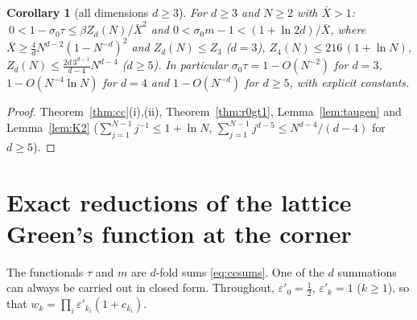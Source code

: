 \documentclass[11pt,a4paper]{article}
\newcommand{\Xb}{\bar X}
\theoremstyle{plain}
\newtheorem{corollary}[theorem]{Corollary}
\theoremstyle{definition}
\numberwithin{equation}{section}
\begin{document}
\begin{corollary}[all dimensions $d\ge3$]\label{cor:alld}
For $d\ge3$ and $N\ge2$ with $\Xb>1$: $\ 0<1-\sigma_0\tau\le\beta Z_d(N)/\Xb^2$ and $0<\sigma_0m-1<(1+\ln 2d)/\Xb$, where $\Xb\ge\frac4dN^{d-2}(1-N^{-d})^2$ and $Z_d(N)\le Z_3$ ($d=3$), $Z_4(N)\le216\,(1+\ln N)$, $Z_d(N)\le\frac{2d\,3^{d-1}}{d-4}N^{d-4}$ ($d\ge5$). In particular $\sigma_0\tau=1-O(N^{-2})$ for $d=3$, $1-O(N^{-4}\ln N)$ for $d=4$ and $1-O(N^{-d})$ for $d\ge5$, with explicit constants.
\end{corollary}
\begin{proof}
Theorem~\ref{thm:cc}(i),(ii), Theorem~\ref{thm:r0gt1}, Lemma~\ref{lem:taugen} and Lemma~\ref{lem:K2} ($\sum_{j=1}^{N-1}j^{-1}\le1+\ln N$, $\sum_{j=1}^{N-1}j^{d-5}\le N^{d-4}/(d-4)$ for $d\ge5$).
\end{proof}

\section{Exact reductions of the lattice Green's function at the corner}\label{sec:reductions}

The functionals $\tau$ and $m$ are $d$-fold sums \eqref{eq:ccsums}. One of the $d$ summations can always be carried out in closed form. Throughout, $\varepsilon'_0=\frac12$, $\varepsilon'_k=1$ ($k\ge1$), so that $w_k=\prod_i\varepsilon'_{k_i}(1+c_{k_i})$.
\end{document}
